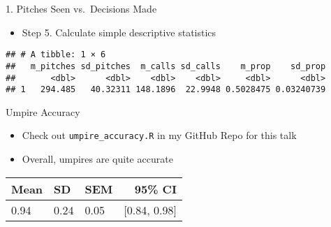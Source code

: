 \begin{frame}[fragile]{1. Pitches Seen vs.~Decisions Made}

\begin{itemize}
\tightlist
\item
  Step 5. Calculate simple descriptive statistics
\end{itemize}

\footnotesize

\begin{Shaded}
\end{Shaded}

\begin{verbatim}
## # A tibble: 1 × 6
##   m_pitches sd_pitches  m_calls sd_calls    m_prop    sd_prop
##       <dbl>      <dbl>    <dbl>    <dbl>     <dbl>      <dbl>
## 1   294.485   40.32311 148.1896  22.9948 0.5028475 0.03240739
\end{verbatim}

\end{frame}

\begin{frame}[fragile]{Umpire Accuracy}

\begin{itemize}
\tightlist
\item
  Check out \texttt{umpire\_accuracy.R} in my GitHub Repo for this talk
\item
  Overall, umpires are quite accurate
\end{itemize}

\begin{table}[ht]
\centering
\begin{tabular}{lllr}
\hline
Mean & SD & SEM & 95\% CI \\ 
\hline
0.94 & 0.24 & 0.05 & [0.84, 0.98] \\ 
\hline
\end{tabular}
\end{table}

\end{frame}

